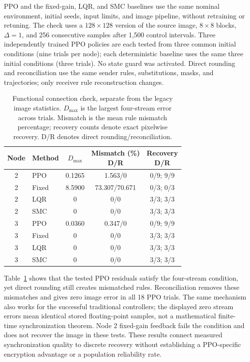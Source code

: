 \documentclass[a4paper,fleqn]{cas-sc}
\theoremstyle{plain}
\theoremstyle{definition}
\begin{document}
PPO and the fixed-gain, LQR, and SMC baselines use the same nominal environment, initial seeds, input limits, and image pipeline, without retraining or retuning. The check uses a $128\times128$ version of the source image, $8\times8$ blocks, $\Delta=1$, and 256 consecutive samples after 1,500 control intervals. Three independently trained PPO policies are each tested from three common initial conditions (nine trials per node); each deterministic baseline uses the same three initial conditions (three trials). No state guard was activated. Direct rounding and reconciliation use the same sender rules, substitutions, masks, and trajectories; only receiver rule reconstruction changes.

\begin{table}[pos=htbp,width=\linewidth]
\centering\small
\setlength{\tabcolsep}{3pt}
\caption{Functional connection check, separate from the legacy image statistics. $D_{\max}$ is the largest four-stream error across trials. Mismatch is the mean rule mismatch percentage; recovery counts denote exact pixelwise recovery. D/R denotes direct rounding/reconciliation.}
\label{tab:sync_application_bridge}
\begin{tabular}{@{}clccc@{}}
\toprule
Node & Method & $D_{\max}$ & \makecell{Mismatch (\%)\\D/R} & \makecell{Recovery\\D/R}\\
\midrule
2 & PPO & 0.1265 & 1.563/0 & 0/9; 9/9\\
2 & Fixed & 8.5900 & 73.307/70.671 & 0/3; 0/3\\
2 & LQR & 0 & 0/0 & 3/3; 3/3\\
2 & SMC & 0 & 0/0 & 3/3; 3/3\\
3 & PPO & 0.0360 & 0.347/0 & 0/9; 9/9\\
3 & Fixed & 0 & 0/0 & 3/3; 3/3\\
3 & LQR & 0 & 0/0 & 3/3; 3/3\\
3 & SMC & 0 & 0/0 & 3/3; 3/3\\
\bottomrule
\end{tabular}
\end{table}

Table~\ref{tab:sync_application_bridge} shows that the tested PPO residuals satisfy the four-stream condition, yet direct rounding still creates mismatched rules. Reconciliation removes these mismatches and gives zero image error in all 18 PPO trials. The same mechanism also works for the successful traditional controllers; the displayed zero stream errors mean identical stored floating-point samples, not a mathematical finite-time synchronization theorem. Node 2 fixed-gain feedback fails the condition and does not recover the image in these tests. These results connect measured synchronization quality to discrete recovery without establishing a PPO-specific encryption advantage or a population reliability rate.
\end{document}
